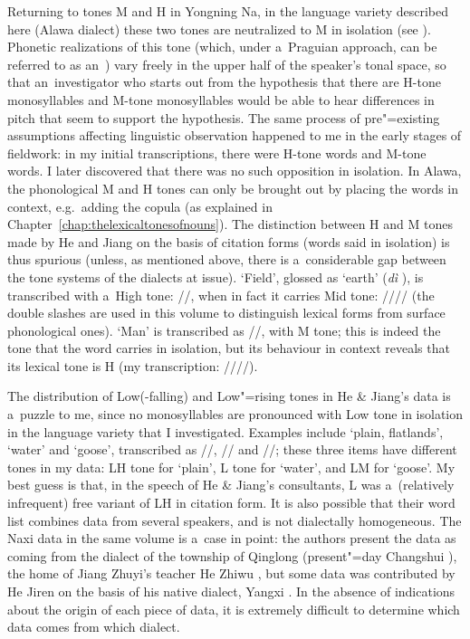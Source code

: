 Returning to tones M and H in Yongning Na, in the language variety described here (Alawa dialect) these two tones
are neutralized to M in isolation (see ). Phonetic realizations of this tone (which, under a~Praguian
approach, can be referred to as an~) vary freely in the upper half of the speaker’s tonal
space, so that an~investigator who starts out from the hypothesis that there are H-tone
monosyllables and M-tone monosyllables would be able to hear differences in pitch that seem to support
the hypothesis. The same process of pre"=existing assumptions affecting linguistic observation
happened to me in the early stages of fieldwork: in my initial transcriptions, there were H-tone
words and M-tone words. I later discovered that there was no such opposition in isolation. In Alawa, the
phonological M and H tones can only be brought out by placing the words in context,
e.g.~adding the {copula} (as explained in Chapter~\ref{chap:thelexicaltonesofnouns}). The distinction between H and M tones made by He
and Jiang on the basis of citation forms (words said in isolation) is thus spurious (unless, as mentioned above, there is
a~considerable gap between the tone systems of the dialects at issue). ‘Field’, glossed as ‘earth’
(\textit{dì} ), is transcribed with a~High tone: //, when in fact it carries Mid
tone: //// (the double slashes are used in this volume to distinguish lexical forms
from surface phonological ones). ‘Man’ is transcribed as //, with M tone; this is indeed
the tone that the word carries in isolation, but its behaviour in context reveals that its lexical
tone is H (my transcription: ////).

The distribution of Low(-falling) and Low"=rising tones in He \& Jiang’s data is a~puzzle to me,
since no monosyllables are pronounced with Low tone in isolation in the language variety that I
investigated. Examples include ‘plain, flatlands’, ‘water’ and ‘goose’, transcribed as //,
// and //; these three items have different tones in my data: LH tone for
‘plain’, L tone for ‘water’, and LM for ‘goose’. My best guess is that, in the speech of
He \& Jiang’s consultants, L was a~(relatively infrequent) free {variant} of LH in {citation form}. It
is also possible that their word list combines data from several speakers, and is not dialectally
homogeneous. The Naxi data in the same volume is a~case in point: the authors present the data as
coming from the dialect of the township of Qinglong  (present"=day Changshui ), the
home of Jiang Zhuyi’s teacher He Zhiwu , but some data was contributed by He Jiren on
the basis of his native dialect, Yangxi . In the absence of indications about the origin of each piece of data, it is extremely difficult to determine which data comes from which
dialect.

